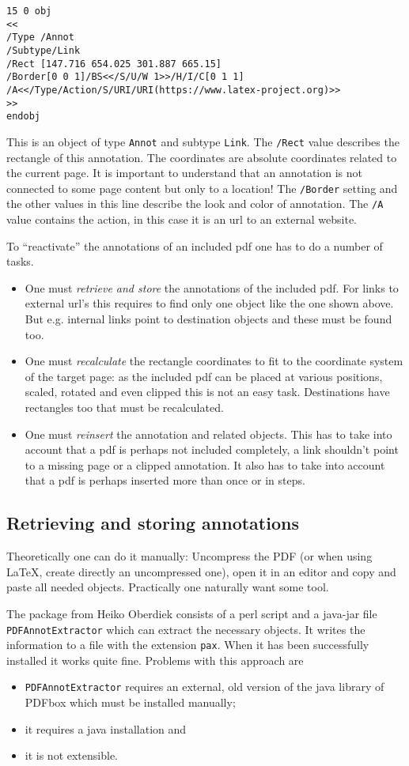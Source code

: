\documentclass[DIV=12,parskip=half-,bibliography=totoc]{scrartcl}
\begin{document}
\begin{lstlisting}
15 0 obj
<<
/Type /Annot
/Subtype/Link
/Rect [147.716 654.025 301.887 665.15]
/Border[0 0 1]/BS<</S/U/W 1>>/H/I/C[0 1 1]
/A<</Type/Action/S/URI/URI(https://www.latex-project.org)>>
>>
endobj
\end{lstlisting}
This is an object of type \texttt{Annot} and subtype \texttt{Link}.
The \texttt{/Rect} value describes the rectangle of this annotation. The coordinates are absolute coordinates related to the current page. It is important to understand that an annotation is not connected to some page content but only to a location!
The \texttt{/Border} setting and the other values in this line describe the look and color of annotation. The \texttt{/A} value contains the action, in this case it is an url to an external website.


To \enquote{reactivate} the annotations of an included pdf one has to do a number of tasks.
\begin{itemize}
\item One must \emph{retrieve and store} the annotations of the included pdf. For links to external url's this requires to find only one object like the one shown above. But e.g. internal links point to destination objects and these must be found too.
\item One must \emph{recalculate} the rectangle coordinates to fit to the coordinate system of the target page: as the included pdf can be placed at various positions, scaled, rotated and even clipped this is not an easy task. Destinations have rectangles too that must be recalculated.
\item  One must  \emph{reinsert} the annotation and related objects. This has to take into account that a pdf is perhaps not included completely, a link shouldn't point to a missing page or a clipped annotation. It also has to take into account that a pdf is perhaps inserted more than once or in steps.
\end{itemize}

\subsection{Retrieving and storing annotations}

Theoretically one can do it manually: Uncompress the PDF (or when using \LaTeX, create directly an uncompressed one), open it in an editor and copy and paste all needed objects. Practically one naturally want some tool.

The  package from Heiko Oberdiek consists of a perl script and a java-jar file \texttt{PDFAnnotExtractor} which can extract the necessary objects. It writes the information to a file with the extension \texttt{pax}.
When it has been successfully installed it works quite fine. Problems with this approach are
\begin{itemize}
\item \texttt{PDFAnnotExtractor} requires an external, old version of the java library of PDFbox which must be installed manually;
\item it requires a java installation and
\item it is not extensible.
\end{itemize}
\end{document}
